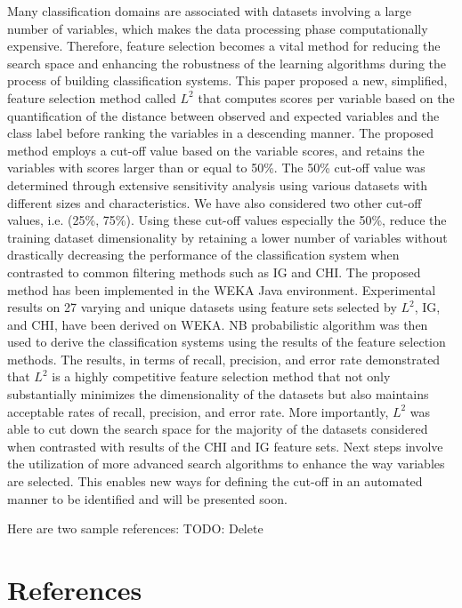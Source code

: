 \documentclass[review]{elsarticle}
\begin{document}
Many classification domains are associated with datasets involving a large number of variables, which makes the data processing phase computationally expensive. Therefore, feature selection becomes a vital method for reducing the search space and enhancing the robustness of the learning algorithms during the process of building classification systems. This paper proposed a new, simplified, feature selection method called $ L^2 $ that computes scores per variable based on the quantification of the distance between observed and expected variables and the class label before ranking the variables in a descending manner. The proposed method employs a cut-off value based on the variable scores, and retains the variables with scores larger than or equal to 50\%. The 50\% cut-off value was determined through extensive sensitivity analysis using various datasets with different sizes and characteristics. We have also considered two other cut-off values, i.e. (25\%, 75\%). Using these cut-off values especially the 50\%, reduce the training dataset dimensionality by retaining a lower number of variables without drastically decreasing the performance of the classification system when contrasted to common filtering methods such as IG and CHI.  The proposed method has been implemented in the WEKA Java environment. Experimental results on 27 varying and unique datasets using feature sets selected by $ L^2 $, IG, and CHI, have been derived on WEKA. NB probabilistic algorithm was then used to derive the classification systems using the results of the feature selection methods. The results, in terms of recall, precision, and error rate demonstrated that $ L^2 $ is a highly competitive feature selection method that not only substantially minimizes the dimensionality of the datasets but also maintains acceptable rates of recall, precision, and error rate. More importantly, $ L^2 $ was able to cut down the search space for the majority of the datasets considered when contrasted with results of the CHI and IG feature sets.  Next steps involve the utilization of more advanced search algorithms to enhance the way variables are selected.  This enables new ways for defining the cut-off in an automated manner to be identified and will be presented soon.  


Here are two sample references: TODO: Delete

\cite{Kamalov2017,Kamalov2017a,McCluskey2014,Bunker2019,Chandrashekar2014,Abdelhamid2017,Hall1999}

\section*{References}


\end{document}
